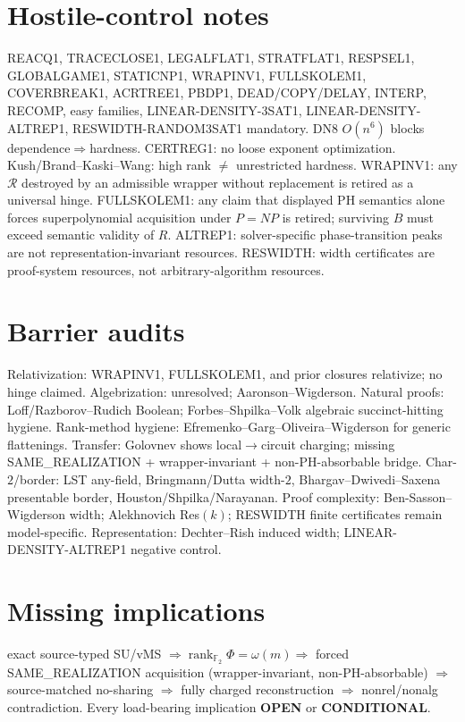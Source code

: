 \documentclass[11pt]{article}
\begin{document}
\section*{Hostile-control notes}
REACQ1, TRACECLOSE1, LEGALFLAT1, STRATFLAT1, RESPSEL1, GLOBALGAME1, STATICNP1, WRAPINV1,
FULLSKOLEM1, COVERBREAK1, ACRTREE1, PBDP1, DEAD/COPY/DELAY, INTERP, RECOMP, easy families,
LINEAR-DENSITY-3SAT1, LINEAR-DENSITY-ALTREP1, RESWIDTH-RANDOM3SAT1 mandatory.
DN8 $O(n^6)$ blocks dependence$\Rightarrow$hardness. CERTREG1: no loose exponent optimization.
Kush/Brand--Kaski--Wang: high rank $\neq$ unrestricted hardness.
WRAPINV1: any $\mathcal R$ destroyed by an admissible wrapper without replacement is retired
as a universal hinge.
FULLSKOLEM1: any claim that displayed PH semantics alone forces superpolynomial acquisition
under $P=NP$ is retired; surviving $B$ must exceed semantic validity of $R$.
ALTREP1: solver-specific phase-transition peaks are not representation-invariant resources.
RESWIDTH: width certificates are proof-system resources, not arbitrary-algorithm resources.

\section*{Barrier audits}
Relativization: WRAPINV1, FULLSKOLEM1, and prior closures relativize; no hinge claimed.
Algebrization: unresolved; Aaronson--Wigderson. Natural proofs: Loff/Razborov--Rudich Boolean;
Forbes--Shpilka--Volk algebraic succinct-hitting hygiene. Rank-method hygiene:
Efremenko--Garg--Oliveira--Wigderson for generic flattenings. Transfer: Golovnev shows
local$\to$circuit charging; missing SAME\_REALIZATION + wrapper-invariant + non-PH-absorbable
bridge. Char-$2$/border: LST any-field, Bringmann/Dutta width-$2$, Bhargav--Dwivedi--Saxena
presentable border, Houston/Shpilka/Narayanan. Proof complexity: Ben-Sasson--Wigderson width;
Alekhnovich Res$(k)$; RESWIDTH finite certificates remain model-specific.
Representation: Dechter--Rish induced width; LINEAR-DENSITY-ALTREP1 negative control.

\section*{Missing implications}
exact source-typed SU/vMS $\Rightarrow\operatorname{rank}_{\mathbb F_2}\Phi=\omega(m)
\Rightarrow$ forced SAME\_REALIZATION acquisition (wrapper-invariant, non-PH-absorbable)
$\Rightarrow$ source-matched no-sharing $\Rightarrow$ fully charged reconstruction
$\Rightarrow$ nonrel/nonalg contradiction.
Every load-bearing implication \textbf{OPEN} or \textbf{CONDITIONAL}.
\end{document}
